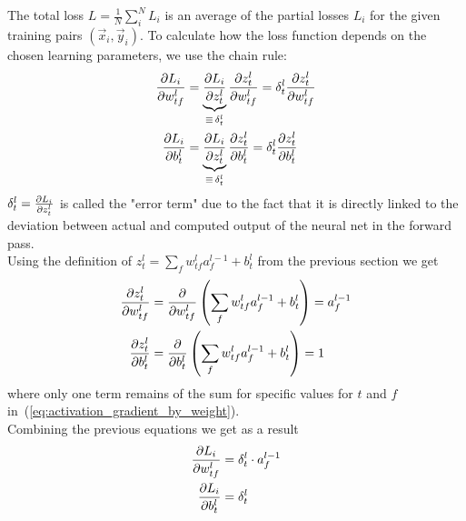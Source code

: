 The total loss $L = \frac{1}{N}\sum\limits_i^{N}{L_i}$ is an average of the partial losses
$L_i$ for the given training pairs $(\vec{x}_i, \vec{y}_i)$. To calculate how the loss
function depends on the chosen learning parameters, we use the chain rule:
\begin{subequations}
    \begin{align}
        \frac{\partial {L_i}}{\partial {w_{tf}^l}} & = \underbrace{\frac{\partial {L_i}}{\partial {z_t^l}}}_{\equiv\,\delta_t^l} \frac{\partial {z_t^l}}{\partial {w_{tf}^l}}
        = \delta_t^l \frac{\partial {z_t^l}}{\partial {w_{tf}^l}}
        \label{eq:loss_gradient_by_weight} \\
        \frac{\partial {L_i}}{\partial {b_t^l}} & =  \underbrace{\frac{\partial {L_i}}{\partial {z_t^l}}}_{\equiv\,\delta_t^l} \frac{\partial {z_t^l}}{\partial {b_t^l}}
        = \delta_t^l \frac{\partial {z_t^l}}{\partial {b_t^l}}
        \label{eq:loss_gradient_by_bias}  
    \end{align}
\end{subequations}
$\delta_t^l = \frac{\partial {L_i}}{\partial {z_t^l}}$ is called the "error term" due to the fact that it is
directly linked to the deviation between actual and computed output of the neural net in
the forward pass. \\

Using the definition of $z_t^l = \sum_{f}{w^l_{tf} a^{l-1}_f} + b^l_t$
from the previous section we get
\begin{subequations}
    \begin{align}
    \frac{\partial {z_t^l}}{\partial {w^l_{tf}}} & =\frac{\partial {}}{\partial {w^l_{tf}}}\left(
        \sum\limits_{f}{w^l_{tf} a^{l-1}_f} + b^l_t
        \right) = a^{l-1}_f \label{eq:activation_gradient_by_weight} \\
    \frac{\partial {z_t^l}}{\partial {b^l_t}} & =\frac{\partial {}}{\partial {b^l_t}}\left(
        \sum\limits_{f}{w^l_{tf} a^{l-1}_f} + b^l_t
        \right) = 1 \label{eq:activation_gradient_by_bias}
\end{align}
\end{subequations}
where only one term remains of the sum for specific values for $t$ and $f$
in~(\ref{eq:activation_gradient_by_weight}). \\

Combining the previous equations we get as a result
\begin{subequations}
    \begin{align}
        \frac{\partial {L_i}}{\partial {w_{tf}^l}} & = \delta_t^l \cdot a^{l-1}_f
        \label{eq:loss_gradient_by_weight_condensed}\\
        \frac{\partial {L_i}}{\partial {b^l_t}} & = \delta_t^l
        \label{eq:loss_gradient_by_bias_condensed}
    \end{align}
\end{subequations}

